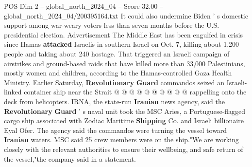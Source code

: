 \begin{textsample}{POS Dim 2 – global\_north\_2024\_04 – Score 32.00 – global\_north\_2024\_04/200395164.txt}
It could also undermine Biden ' s domestic support among war-weary voters less than seven months before the U.S. presidential election.
Advertisement The Middle East has been engulfed in crisis since Hamas \textbf{attacked} Israelis in southern Israel on Oct. 7, killing about 1,200 people and taking about 240 hostage.
That triggered an Israeli campaign of airstrikes and ground-based raids that have killed more than 33,000 Palestinians, mostly women and children, according to the Hamas-controlled Gaza Health Ministry.
Earlier Saturday, \textbf{Revolutionary} \textbf{Guard} commandos seized an Israeli-linked container ship near the Strait @ @ @ @ @ @ @ @ @ @ rappelling onto the deck from helicopters.
IRNA, the state-run \textbf{Iranian} news agency, said the \textbf{Revolutionary} \textbf{Guard} ' s naval unit took the MSC Aries, a Portuguese-flagged cargo ship associated with Zodiac Maritime \textbf{Shipping} Co. and Israeli billionaire Eyal Ofer.
The agency said the commandos were turning the vessel toward \textbf{Iranian} waters.
MSC said 25 crew members were on the ship."We are working closely with the relevant authorities to ensure their wellbeing, and safe return of the vessel,"the company said in a statement.

\end{textsample}
